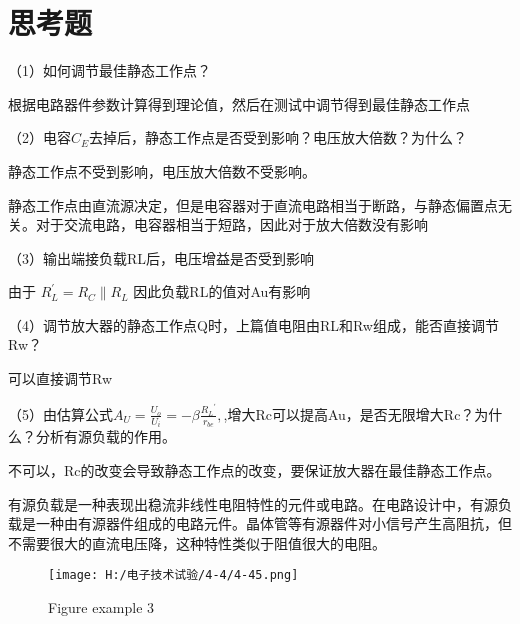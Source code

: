 \documentclass{article}
\begin{document}
\section{思考题}
（1）如何调节最佳静态工作点？\par
根据电路器件参数计算得到理论值，然后在测试中调节得到最佳静态工作点\par
（2）电容$C_E$去掉后，静态工作点是否受到影响？电压放大倍数？为什么？\par
静态工作点不受到影响，电压放大倍数不受影响。\par
静态工作点由直流源决定，但是电容器对于直流电路相当于断路，与静态偏置点无关。对于交流电路，电容器相当于短路，因此对于放大倍数没有影响\par
（3）输出端接负载RL后，电压增益是否受到影响\par
由于 $R_L^{'}=R_C\| R_L$ 因此负载RL的值对Au有影响\par
（4）调节放大器的静态工作点Q时，上篇值电阻由RL和Rw组成，能否直接调节Rw？\par
可以直接调节Rw\par
（5）由估算公式$ A_U=\frac{U_o}{U_i}=-\beta\frac{{R_L}^{'}}{r_{be}},$,增大Rc可以提高Au，是否无限增大Rc？为什么？分析有源负载的作用。\par
不可以，Rc的改变会导致静态工作点的改变，要保证放大器在最佳静态工作点。\par
有源负载是一种表现出稳流非线性电阻特性的元件或电路。在电路设计中，有源负载是一种由有源器件组成的电路元件。晶体管等有源器件对小信号产生高阻抗，但不需要很大的直流电压降，这种特性类似于阻值很大的电阻。\par
\begin{figure}[h]
	\centering
	\texttt{[image: H:/电子技术试验/4-4/4-45.png]}
	\caption{Figure example 3} \label{fig:aa}
\end{figure}
\end{document}

